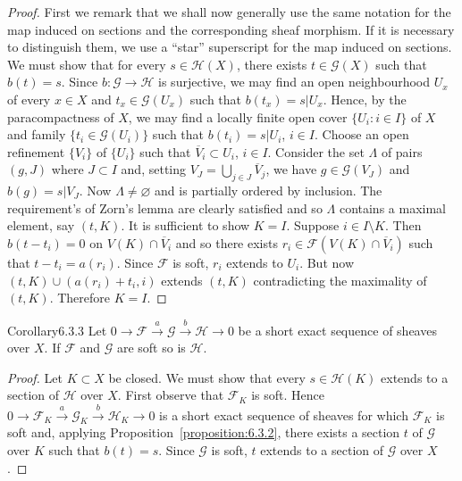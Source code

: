 \begin{proof}
First we remark that we shall now generally use the same notation for the map induced on sections and the corresponding sheaf morphism. If it is necessary to distinguish them, we use a ``star'' superscript for the map induced on sections.
We must show that for every $s\in\mathcal H(X)$, there exists $t\in\mathcal G(X)$ such that $b(t)=s$. Since $b:\mathcal G\to\mathcal H$ is surjective, we may find an open neighbourhood $U_x$ of every $x\in X$ and $t_x\in\mathcal G(U_x)$ such that $b(t_x)=s|U_x$. Hence, by the paracompactness of $X$, we may find a locally finite open cover $\{U_i:i\in I\}$ of $X$ and family $\{t_i\in\mathcal G(U_i)\}$ such that $b(t_i)=s|U_i$, $i\in I$. Choose an open refinement $\{V_i\}$ of $\{U_i\}$ such that $\overline V_i\subset U_i$, $i\in I$. Consider the set $\Lambda$ of pairs $(g,J)$ where $J\subset I$ and, setting $V_J=\bigcup_{j\in J}\overline V_j$, we have $g\in\mathcal G(V_J)$ and $b(g)=s|V_J$. Now $\Lambda\neq\varnothing$ and is partially ordered by inclusion. The requirement's of Zorn's lemma are clearly satisfied and so $\Lambda$ contains a maximal element, say $(t,K)$. It is sufficient to show $K=I$. Suppose $i\in I\setminus K$. Then $b(t-t_i)=0$ on $V(K)\cap\overline V_i$ and so there exists $r_i\in\mathcal F(V(K)\cap\overline V_i)$ such that $t-t_i=a(r_i)$. Since $\mathcal F$ is soft, $r_i$ extends to $U_i$. But now $(t,K)\cup(a(r_i)+t_i,i)$ extends $(t,K)$ contradicting the maximality of $(t,K)$. Therefore $K=I$.
\end{proof}
\begin{originaltheorem}{Corollary}{6.3.3}
Let $0\to\mathcal F\xrightarrow a\mathcal G\xrightarrow b\mathcal H\to0$ be a short exact sequence of sheaves over $X$. If $\mathcal F$ and $\mathcal G$ are soft so is $\mathcal H$.
\end{originaltheorem}
\begin{proof}
Let $K\subset X$ be closed. We must show that every $s\in\mathcal H(K)$ extends to a section of $\mathcal H$ over $X$. First observe that $\mathcal F_K$ is soft. Hence $0\to\mathcal F_K\xrightarrow a\mathcal G_K\xrightarrow b\mathcal H_K\to0$ is a short exact sequence of sheaves for which $\mathcal F_K$ is soft and, applying Proposition~\ref{proposition:6.3.2}, there exists a section $t$ of $\mathcal G$ over $K$ such that $b(t)=s$. Since $\mathcal G$ is soft, $t$ extends to a section of $\mathcal G$ over $X$.
\end{proof}

